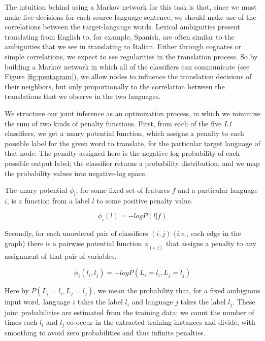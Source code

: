 \documentclass[11pt,letterpaper]{article}
\begin{document}
The intuition behind using a Markov network for this task is that, since we
must make five decisions for each source-language sentence, we should make use
of the correlations between the target-langauge words. Lexical ambiguities
present translating from English to, for example, Spanish, are often similar to
the ambiguities that we see in translating to Italian. Either through cognates
or simple correlations, we expect to see regularities in the translation
process. So by building a Markov network in which all of the classifiers can
communicate (see Figure \ref{fig:pentagram}), we allow nodes to influence the
translation decisions of their neighbors, but only proportionally to the
correlation between the translations that we observe in the two languages.


We structure our joint inference as an optimization process, in which we
minimize the sum of two kinds of penalty functions. First, from each of the
five \emph{L1} classifiers, we get a unary potential function, which assigns a
penalty to each possible label for the given word to translate, for the
particular target language of that node. The penalty assigned here is the
negative log-probability of each possible output label; the classifier returns
a probability distribution, and we map the probability values into negative-log
space.

The unary potential $\phi_i$, for some fixed set of features $f$ and a
particular language $i$, is a function from a label $l$ to some positive
penalty value.

$$
\phi_i(l) = - log P(l | f)
$$

Secondly, for each unordered pair of classifiers $(i,j)$ (\emph{i.e.}, each
edge in the graph) there is a pairwise potential function $\phi_{(i,j)}$ that
assigns a penalty to any assignment of that pair of variables.

$$
\phi_i(l_i, l_j) = - log P(L_i = l_i, L_j = l_j)
$$

Here by $P(L_i = l_i, L_j = l_j)$, we mean the probability that, for a fixed
ambiguous input word, language $i$ takes the label $l_i$ and language $j$ takes
the label $l_j$. These joint probabilities are estimated from the training
data; we count the number of times each $l_i$ and $l_j$ co-occur in the
extracted training instances and divide, with smoothing to avoid zero
probabilities and thus infinite penalties.
\end{document}
